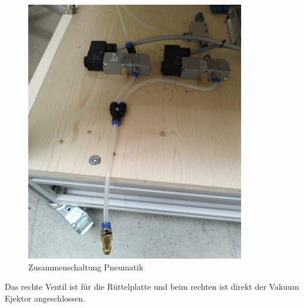 \begin{figure}[H]
    \centering
    \includegraphics[scale=0.6]{image/zusammenpneumatik.jpg}
    \caption{Zusammenschaltung Pneumatik}
    \label{fig:enter-label}
\end{figure}
Das rechte Ventil ist für die Rüttelplatte und beim rechten ist direkt der Vakuum Ejektor angeschlossen. \\

